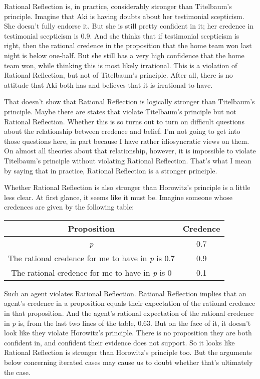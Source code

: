 \documentclass[
  10pt,
  letterpaper,
  twoside]{scrbook}
\begin{document}
Rational Reflection is, in practice, considerably stronger than
Titelbaum's principle. Imagine that {Aki} is having doubts about her
testimonial scepticism. She doesn't fully endorse it. But she is still
pretty confident in it; her credence in testimonial scepticism is 0.9.
And she thinks that if testimonial scepticism is right, then the
rational credence in the proposition that the home team won last night
is below one-half. But she still has a very high confidence that the
home team won, while thinking this is most likely irrational. This is a
violation of Rational Reflection, but not of Titelbaum's principle.
After all, there is no attitude that {Aki} both has and believes that it
is irrational to have.

That doesn't show that Rational Reflection is logically stronger than
Titelbaum's principle. Maybe there are states that violate Titelbaum's
principle but not Rational Reflection. Whether this is so turns out to
turn on difficult questions about the relationship between credence and
belief. I'm not going to get into those questions here, in part because
I have rather idiosyncratic views on them. On almost all theories about
that relationship, however, it is impossible to violate Titelbaum's
principle without violating Rational Reflection. That's what I mean by
saying that in practice, Rational Reflection is a stronger principle.

Whether Rational Reflection is also stronger than Horowitz's principle
is a little less clear. At first glance, it seems like it must be.
Imagine someone whose credences are given by the following table:

\begin{longtable}[]{@{}cc@{}}
\toprule\noalign{}
Proposition & Credence \\
\midrule\noalign{}
\endhead
\bottomrule\noalign{}
\endlastfoot
\emph{p} & 0.7 \\
The rational credence for me to have in \emph{p} is 0.7 & 0.9 \\
The rational credence for me to have in \emph{p} is 0 & 0.1 \\
\end{longtable}

Such an agent violates Rational Reflection. Rational Reflection implies
that an agent's credence in a proposition equals their expectation of
the rational credence in that proposition. And the agent's rational
expectation of the rational credence in \emph{p} is, from the last two
lines of the table, 0.63. But on the face of it, it doesn't look like
they violate Horowitz's principle. There is no proposition they are both
confident in, and confident their evidence does not support. So it looks
like Rational Reflection is stronger than Horowitz's principle too. But
the arguments below concerning iterated cases may cause us to doubt
whether that's ultimately the case.
\end{document}
